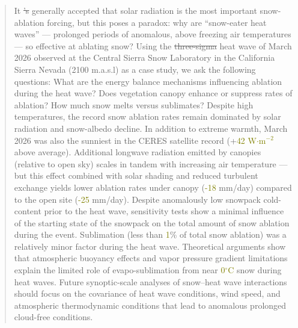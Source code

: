 \documentclass[draft]{agujournal2019}
\newcommand{\mynum}[1]{\textcolor{olive}{#1}}
\newcommand{\wmsq}{\textcolor{olive}{W$\cdot$m$^{-2}$}\xspace}
\newcommand{\degrc}{\textcolor{olive}{$^\circ$C}\xspace}
\providecommand{\DIFadd}[1]{{\protect\color{blue}\uwave{#1}}} %
\providecommand{\DIFdel}[1]{{\protect\color{red}\sout{#1}}}                      %
\providecommand{\DIFaddbegin}{} %
\providecommand{\DIFaddend}{} %
\providecommand{\DIFdelbegin}{} %
\providecommand{\DIFdelend}{} %
\begin{document}
\begin{abstract}
It \DIFdelbegin \DIFdel{'s }\DIFdelend \DIFaddbegin \DIFadd{is }\DIFaddend generally accepted that solar radiation is the most important snow-ablation forcing, but this poses a paradox: why are ``snow-eater heat waves'' --- prolonged periods of anomalous, above freezing air temperatures --- so effective at ablating snow? 
Using the \DIFdelbegin \DIFdel{three-sigma }\DIFdelend \DIFaddbegin \DIFadd{3-$\sigma$ }\DIFaddend heat wave of March 2026 observed at the Central Sierra Snow Laboratory in the California Sierra Nevada (2100 m.a.s.l) as a case study, we ask the following questions: What are the energy balance mechanisms influencing ablation during the heat wave? 
Does vegetation canopy enhance or suppress rates of ablation? 
How much snow melts versus sublimates?
Despite high temperatures, the record snow ablation rates remain dominated by solar radiation and snow-albedo decline.
In addition to extreme warmth, March 2026 was also the sunniest in the CERES satellite record (+\mynum{42} \wmsq above average).
Additional longwave radiation emitted by canopies (relative to open sky) scales in tandem with increasing air temperature --- but this effect combined with solar shading and reduced turbulent exchange yields lower ablation rates under canopy (\mynum{-18} mm/day) compared to the open site (\mynum{-25} mm/day). 
Despite anomalously low snowpack cold-content prior to the heat wave, sensitivity tests show a minimal influence of the starting state of the snowpack on the total amount of snow ablation during the event.
Sublimation (less than \mynum{1}\% of total snow ablation) was a relatively minor factor during the heat wave. 
Theoretical arguments show that atmospheric buoyancy effects and vapor pressure gradient limitations explain the limited role of evapo-sublimation from near \mynum{0}\degrc snow during heat waves. 
Future synoptic-scale analyses of snow--heat wave interactions should focus on the covariance of heat wave conditions, wind speed, and atmospheric thermodynamic conditions that lead to anomalous prolonged cloud-free conditions.

\end{abstract}
\end{document}
